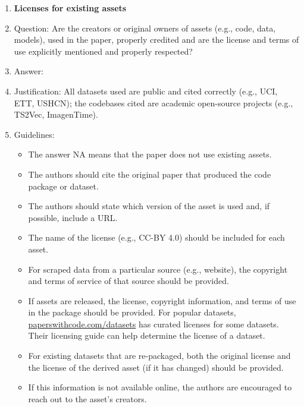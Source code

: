 \documentclass{article}
\theoremstyle{plain}
\theoremstyle{definition}
\theoremstyle{remark}
\begin{document}
{\begin{enumerate}
\item {\bf Licenses for existing assets}
    \item[] Question: Are the creators or original owners of assets (e.g., code, data, models), used in the paper, properly credited and are the license and terms of use explicitly mentioned and properly respected?
    \item[] Answer: \answerYes{}
    \item[] Justification: All datasets used are public and cited correctly (e.g., UCI, ETT, USHCN); the codebases cited are academic open-source projects (e.g., TS2Vec, ImagenTime).
    \item[] Guidelines:
    \begin{itemize}
        \item The answer NA means that the paper does not use existing assets.
        \item The authors should cite the original paper that produced the code package or dataset.
        \item The authors should state which version of the asset is used and, if possible, include a URL.
        \item The name of the license (e.g., CC-BY 4.0) should be included for each asset.
        \item For scraped data from a particular source (e.g., website), the copyright and terms of service of that source should be provided.
        \item If assets are released, the license, copyright information, and terms of use in the package should be provided. For popular datasets, \url{paperswithcode.com/datasets} has curated licenses for some datasets. Their licensing guide can help determine the license of a dataset.
        \item For existing datasets that are re-packaged, both the original license and the license of the derived asset (if it has changed) should be provided.
        \item If this information is not available online, the authors are encouraged to reach out to the asset's creators.
    \end{itemize}


\end{enumerate}}
\end{document}
